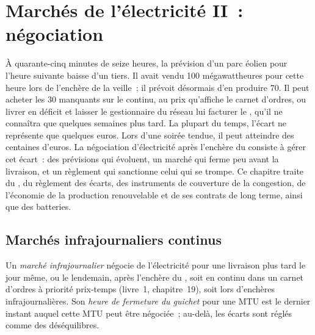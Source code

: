 \chapter{Marchés de l'électricité II~: négociation}\label{ch:m3:power-markets-trading}

À quarante-cinq minutes de seize heures, la prévision d'un parc éolien pour l'heure suivante baisse d'un tiers.
Il avait vendu 100 mégawattheures pour cette heure lors de l'enchère de la veille~; il prévoit désormais d'en produire 70.
Il peut acheter les 30 manquants sur le  continu, au prix qu'affiche le carnet d'ordres,
ou livrer en déficit et laisser le gestionnaire du réseau lui facturer le ,
qu'il ne connaîtra que quelques semaines plus tard. La plupart du temps, l'écart ne représente que quelques euros.
Lors d'une soirée tendue, il peut atteindre des centaines d'euros. La négociation d'électricité après l'enchère du 
consiste à gérer cet écart~: des prévisions qui évoluent, un marché qui ferme peu avant la livraison,
et un règlement qui sanctionne celui qui se trompe. Ce chapitre traite du , du règlement des écarts,
des instruments de couverture de la congestion, de l'économie de la production renouvelable
et de ses contrats de long terme, ainsi que des batteries.

\section{Marchés infrajournaliers continus}

\begin{definition}\label{def:m3:power-markets-trading:intraday}
Un \emph{marché infrajournalier} négocie de l'électricité pour une livraison plus tard le jour même,
ou le lendemain, après l'enchère du , soit en continu dans un carnet d'ordres
à priorité prix-temps (livre~1, chapitre~19), soit lors d'enchères infrajournalières. Son \emph{heure de
fermeture du guichet} pour une MTU est le dernier instant auquel cette MTU peut être négociée~;
au-delà, les écarts sont réglés comme des déséquilibres.
\end{definition}

